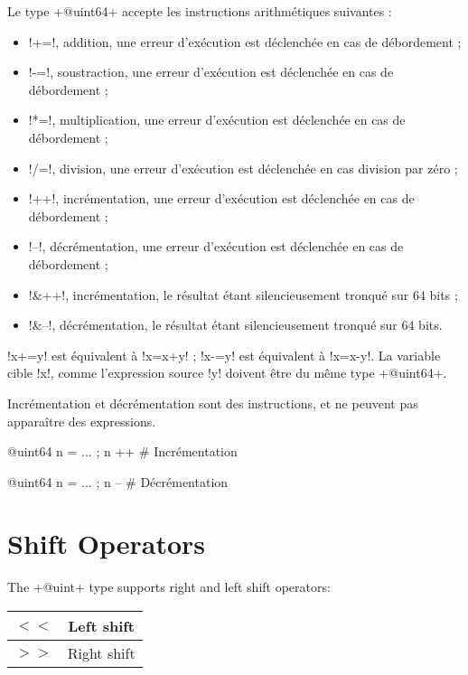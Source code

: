 Le type \ggs+@uint64+ accepte les instructions arithmétiques suivantes :
\begin{itemize}
  \item \ggs!+=!, addition, une erreur d'exécution est déclenchée en cas de débordement ;
  \item \ggs!-=!, soustraction, une erreur d'exécution est déclenchée en cas de débordement ;
  \item \ggs!*=!, multiplication, une erreur d'exécution est déclenchée en cas de débordement ;
  \item \ggs!/=!, division, une erreur d'exécution est déclenchée en cas division par zéro ;
  \item \ggs!++!, incrémentation, une erreur d'exécution est déclenchée en cas de débordement ;
  \item \ggs!--!, décrémentation, une erreur d'exécution est déclenchée en cas de débordement ;
  \item \ggs!&++!, incrémentation, le résultat étant silencieusement tronqué sur 64 bits ;
  \item \ggs!&--!, décrémentation, le résultat étant silencieusement tronqué sur 64 bits.
\end{itemize}

\ggs!x+=y! est équivalent à \ggs!x=x+y! ; \ggs!x-=y! est équivalent à \ggs!x=x-y!.
La variable cible \ggs!x!, comme l'expression source \ggs!y! doivent être du même type \ggs+@uint64+. 

Incrémentation et décrémentation sont des instructions, et ne peuvent pas apparaître des expressions.
\begin{galgas}
@uint64 n = ... ; n ++ # Incrémentation
\end{galgas}

\begin{galgas}
@uint64 n = ... ; n -- # Décrémentation
\end{galgas}


\section{Shift Operators}


The \ggs+@uint+ type supports right and left shift operators:\newline

\begin{tabular}{|c|c|}
\hline
$<<$ & Left shift \\
\hline
$>>$ & Right shift \\
\hline
\end{tabular}

